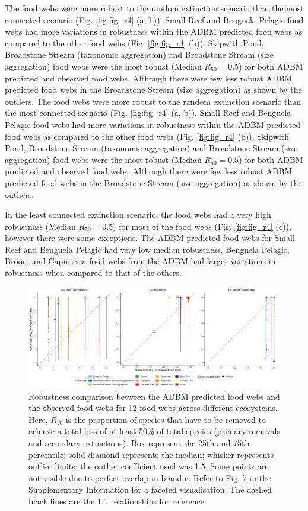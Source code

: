 \documentclass{article}
\begin{document}
The food webs were more robust to the random extinction scenario than
the most connected scenario (Fig. \ref{fig:fig_r4} (a, b)). Small Reef
and Benguela Pelagic food webs had more variations in robustness within
the ADBM predicted food webs as compared to the other food webs (Fig.
\ref{fig:fig_r4} (b)). Skipwith Pond, Broadstone Stream (taxonomic
aggregation) and Broadstone Stream (size aggregation) food webs were the
most robust (Median \(R_{50} = 0.5\)) for both ADBM predicted and
observed food webs. Although there were few less robust ADBM predicted
food webs in the Broadstone Stream (size aggregation) as shown by the
outliers. The food webs were more robust to the random extinction
scenario than the most connected scenario (Fig. \ref{fig:fig_r4} (a,
b)). Small Reef and Benguela Pelagic food webs had more variations in
robustness within the ADBM predicted food webs as compared to the other
food webs (Fig. \ref{fig:fig_r4} (b)). Skipwith Pond, Broadstone Stream
(taxonomic aggregation) and Broadstone Stream (size aggregation) food
webs were the most robust (Median \(R_{50} = 0.5\)) for both ADBM
predicted and observed food webs. Although there were few less robust
ADBM predicted food webs in the Broadstone Stream (size aggregation) as
shown by the outliers.

In the least connected extinction scenario, the food webs had a very
high robustness (Median \(R_{50} = 0.5\)) for most of the food webs
(Fig. \ref{fig:fig_r4} (c)), however there were some exceptions. The
ADBM predicted food webs for Small Reef and Benguela Pelagic had very
low median robustness. Benguela Pelagic, Broom and Capinteria food webs
from the ADBM had larger variations in robustness when compared to that
of the others.

\begin{figure}

{\centering \includegraphics[width=450px]{../results/plot_R50_ADBM_vs_obs} 

}

\caption{\label{fig:fig_r4} Robustness comparison between the ADBM predicted food webs and the observed food webs for 12 food webs across different ecosystems. Here, $R_{50}$ is the proportion of species that have to be removed to achieve a total loss of at least 50\% of total species (primary removals and secondary extinctions). Box represent the 25th and 75th percentile; solid diamond represents the median; whisker represents outlier limits; the outlier coefficient used was 1.5. Some points are not visible due to perfect overlap in b and c. Refer to Fig. 7 in the Supplementary Information for a faceted visualisation. The dashed black lines are the 1:1 relationships for reference.}\label{fig:unnamed-chunk-5}
\end{figure}
\end{document}
